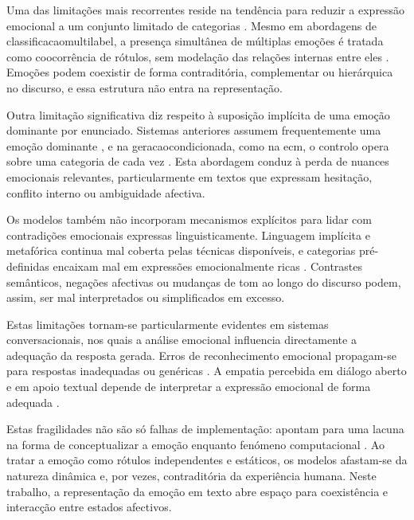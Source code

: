 Uma das limitações mais recorrentes reside na tendência para reduzir a expressão emocional a um conjunto limitado de categorias \parencite{PlazaDelArco2024Trends}. Mesmo em abordagens de \gls{classificacaomultilabel}, a presença simultânea de múltiplas emoções é tratada como coocorrência de rótulos, sem modelação das relações internas entre eles \parencite{Singh2026MultiEmotionIntensity, Zhao2026MEGE}. Emoções podem coexistir de forma contraditória, complementar ou hierárquica no discurso, e essa estrutura não entra na representação.

Outra limitação significativa diz respeito à suposição implícita de uma emoção dominante por enunciado. Sistemas anteriores assumem frequentemente uma emoção dominante \parencite{Singh2026MultiEmotionIntensity}, e na \gls{geracaocondicionada}, como na \gls{ecm}, o controlo opera sobre uma categoria de cada vez \parencite{Zhou2018ECM}. Esta abordagem conduz à perda de nuances emocionais relevantes, particularmente em textos que expressam hesitação, conflito interno ou ambiguidade afectiva.

Os modelos também não incorporam mecanismos explícitos para lidar com contradições emocionais expressas linguisticamente. Linguagem implícita e metafórica continua mal coberta pelas técnicas disponíveis, e categorias pré-definidas encaixam mal em expressões emocionalmente ricas \parencite{Seyeditabari2018Review, PlazaDelArco2024Trends}. Contrastes semânticos, negações afectivas ou mudanças de tom ao longo do discurso podem, assim, ser mal interpretados ou simplificados em excesso.

Estas limitações tornam-se particularmente evidentes em sistemas conversacionais, nos quais a análise emocional influencia directamente a adequação da resposta gerada. Erros de reconhecimento emocional propagam-se para respostas inadequadas ou genéricas \parencite{Huangfu2025NEC}. A empatia percebida em diálogo aberto e em apoio textual depende de interpretar a expressão emocional de forma adequada \parencite{Rashkin2019Empathy, Sharma2020Empathy}.

Estas fragilidades não são só falhas de implementação: apontam para uma lacuna na forma de conceptualizar a emoção enquanto fenómeno computacional \parencite{PlazaDelArco2024Trends, Seyeditabari2018Review}. Ao tratar a emoção como rótulos independentes e estáticos, os modelos afastam-se da natureza dinâmica e, por vezes, contraditória da experiência humana. Neste trabalho, a representação da emoção em texto abre espaço para coexistência e interacção entre estados afectivos.

